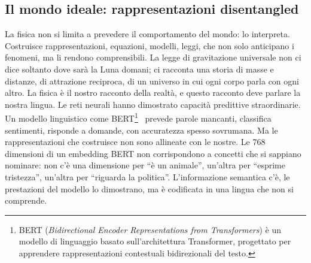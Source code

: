 \subsection{Il mondo ideale: rappresentazioni disentangled}
\label{subsec:mondo_ideale}
La fisica non si limita a prevedere il comportamento del mondo: lo interpreta. Costruisce rappresentazioni, equazioni, modelli, leggi, che non solo anticipano i fenomeni, ma li rendono comprensibili. La legge di gravitazione universale non ci dice soltanto dove sarà la Luna domani; ci racconta una storia di masse e distanze, di attrazione reciproca, di un universo in cui ogni corpo parla con ogni altro. La fisica è il nostro racconto della realtà, e questo racconto deve parlare la nostra lingua.
Le reti neurali hanno dimostrato capacità predittive straordinarie. Un modello linguistico come BERT\footnote{BERT (\textit{Bidirectional Encoder Representations from Transformers}) è un modello di linguaggio basato sull'architettura Transformer, progettato per apprendere rappresentazioni contestuali bidirezionali del testo.}~\parencite{devlin2018bert} prevede parole mancanti, classifica sentimenti, risponde a domande, con accuratezza spesso sovrumana. Ma le rappresentazioni che costruisce non sono allineate con le nostre. Le 768 dimensioni di un embedding BERT non corrispondono a concetti che si sappiano nominare: non c'è una dimensione per ``è un animale'', un'altra per ``esprime tristezza'', un'altra per ``riguarda la politica''. L'informazione semantica c'è, le prestazioni del modello lo dimostrano, ma è codificata in una lingua che non si comprende.
